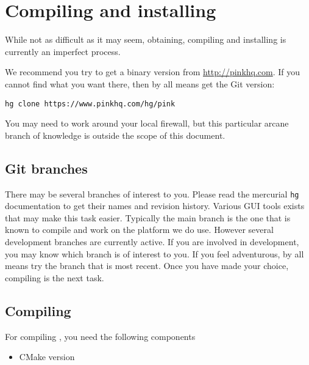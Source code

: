 
\chapter{Compiling and installing \Pink}\label{chap:installing}
While not as difficult as it may seem, obtaining, compiling and installing \Pink
is currently an imperfect process.

We recommend you try to get a binary version from
\url{http://pinkhq.com}. If you cannot find what you want there, then
by all means get the Git version:

\begin{verbatim}
hg clone https://www.pinkhq.com/hg/pink
\end{verbatim}

You may need to work around your local firewall, but this particular
arcane branch of knowledge is outside the scope of this document.

\section{Git branches}
There may be several branches of interest to you. Please read the
mercurial {\tt hg} documentation to get their names and revision
history. Various GUI tools exists that may make this task
easier. Typically the main branch is the one that is known to compile
and work on the platform we do use. However several development
branches are currently active. If you are involved in \Pink
development, you may know which branch is of interest to you. If you
feel adventurous, by all means try the branch that is most
recent. Once you have made your choice, compiling is the next task.


\section{Compiling}
For compiling \Pink, you need the following components

\begin{itemize}
\item CMake version 
\end{itemize}